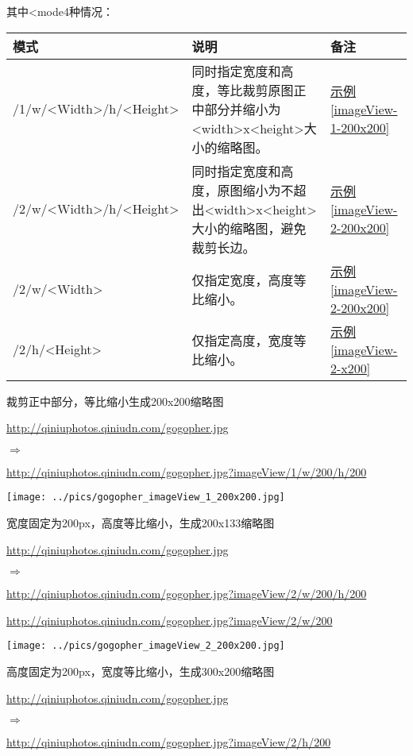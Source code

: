 \documentclass[11pt, oneside]{book}
\newcommand{\qpar}[1]{
\vspace{0.25em}
\noindent
#1\par
\vspace{0.25em}
}
\newcommand{\qurl}[1]{\footnotesize\url{#1}\normalsize}
\newcommand{\qtable}[1]{\footnotesize\vspace{0.5em}#1\vspace{0.5em}\normalsize}
\newcommand{\qsample}[1]{\hyperref[#1]{示例\ref*{#1}}}
\begin{document}
\begin{CJK*}{UTF8}{song}
\qpar{其中\textless mode4种情况：}
\qtable{
\def\arraystretch{2}
\begin{tabular}{|l|p{19em}|l|}
\hline
模式 & 说明 & 备注 \\
\hline
/1/w/\textless Width\textgreater /h/\textless Height\textgreater & 同时指定宽度和高度，等比裁剪原图正中部分并缩小为\textless width\textgreater x\textless height\textgreater 大小的缩略图。& \qsample{imageView-1-200x200} \\
\hline
/2/w/\textless Width\textgreater /h/\textless Height\textgreater & 同时指定宽度和高度，原图缩小为不超出\textless width\textgreater x\textless height\textgreater 大小的缩略图，避免裁剪长边。& \qsample{imageView-2-200x200} \\
\hline
/2/w/\textless Width\textgreater & 仅指定宽度，高度等比缩小。 & \qsample{imageView-2-200x200} \\
\hline
/2/h/\textless Height\textgreater & 仅指定高度，宽度等比缩小。 & \qsample{imageView-2-x200} \\
\hline
\end{tabular}
}

\clearpage

\begin{sample}
  \caption{裁剪正中部分，等比缩小生成200x200缩略图}
    \qpar{\qurl{http://qiniuphotos.qiniudn.com/gogopher.jpg}}
    \qpar{$\Rightarrow$}
    \qpar{\qurl{http://qiniuphotos.qiniudn.com/gogopher.jpg?imageView/1/w/200/h/200}}

    \begin{center}
      \texttt{[image: ../pics/gogopher\_imageView\_1\_200x200.jpg]}
    \end{center}
  \label{imageView-1-200x200}
\end{sample}

\begin{sample}
  \caption{宽度固定为200px，高度等比缩小，生成200x133缩略图}
    \qpar{\qurl{http://qiniuphotos.qiniudn.com/gogopher.jpg}}
    \qpar{$\Rightarrow$}
    \qpar{\qurl{http://qiniuphotos.qiniudn.com/gogopher.jpg?imageView/2/w/200/h/200}}
    \qpar{\qurl{http://qiniuphotos.qiniudn.com/gogopher.jpg?imageView/2/w/200}}

    \begin{center}
      \texttt{[image: ../pics/gogopher\_imageView\_2\_200x200.jpg]}
    \end{center}
  \label{imageView-2-200x200}
\end{sample}

\begin{sample}
  \caption{高度固定为200px，宽度等比缩小，生成300x200缩略图}
    \qpar{\qurl{http://qiniuphotos.qiniudn.com/gogopher.jpg}}
    \qpar{$\Rightarrow$}
    \qpar{\qurl{http://qiniuphotos.qiniudn.com/gogopher.jpg?imageView/2/h/200}}


\end{sample}
\end{CJK*}
\end{document}

